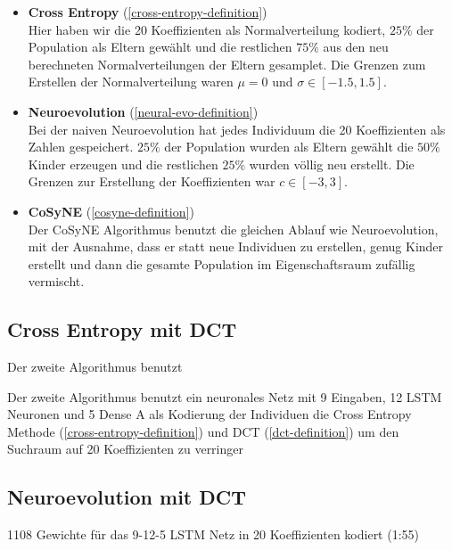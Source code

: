         \begin{itemize}
            \setlength\itemsep{1em}
            \item \textbf{Cross Entropy} (\ref{cross-entropy-definition}) \\
            Hier haben wir die 20 Koeffizienten als Normalverteilung kodiert, $25\%$ der Population als Eltern gewählt und die restlichen $75\%$ aus den neu berechneten Normalverteilungen der Eltern gesamplet. Die Grenzen zum Erstellen der Normalverteilung waren $\mu = 0$ und $\sigma \in [-1.5,1.5]$.

            \item \textbf{Neuroevolution} (\ref{neural-evo-definition}) \\
            Bei der naiven Neuroevolution hat jedes Individuum die 20 Koeffizienten als Zahlen gespeichert. $25\%$ der Population wurden als Eltern gewählt die $50\%$ Kinder erzeugen und die restlichen $25\%$ wurden völlig neu erstellt. Die Grenzen zur Erstellung der Koeffizienten war $c \in [-3,3]$.

            \item \textbf{CoSyNE} (\ref{cosyne-definition}) \\
            Der CoSyNE Algorithmus benutzt die gleichen Ablauf wie Neuroevolution, mit der Ausnahme, dass er statt neue Individuen zu erstellen, genug Kinder erstellt und dann die gesamte Population im Eigenschaftsraum zufällig vermischt.



        \end{itemize}

        \subsection{Cross Entropy mit DCT}

            Der zweite Algorithmus benutzt 

            Der zweite Algorithmus benutzt ein neuronales Netz mit 9 Eingaben, 12 LSTM Neuronen und 5 Dense A als Kodierung der Individuen die Cross Entropy Methode (\ref{cross-entropy-definition}) und DCT (\ref{dct-definition}) um den Suchraum auf 20 Koeffizienten zu verringer

        \subsection{Neuroevolution mit DCT}
            1108 Gewichte für das 9-12-5 LSTM Netz in 20 Koeffizienten kodiert (1:55)

